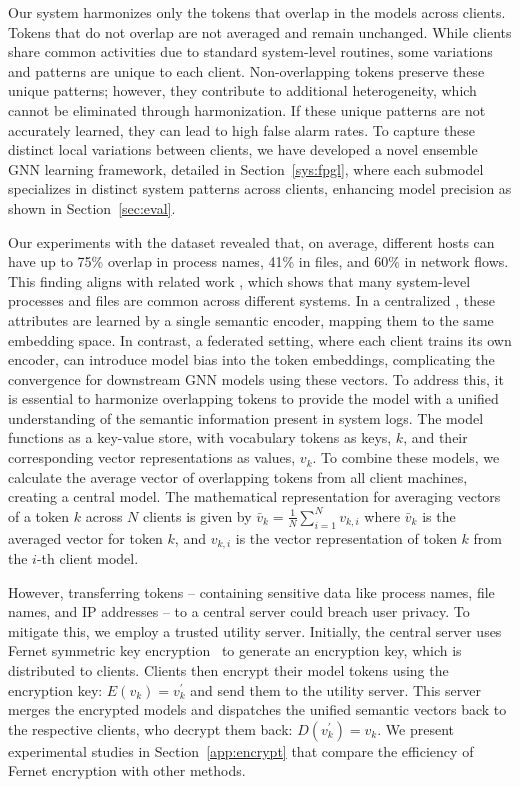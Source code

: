  Our system harmonizes only the tokens that overlap in the \wordvec models across clients. Tokens that do not overlap are not averaged and remain unchanged. While clients share common activities due to standard system-level routines, some variations and patterns are unique to each client. Non-overlapping tokens preserve these unique patterns; however, they contribute to additional heterogeneity, which cannot be eliminated through harmonization. If these unique patterns are not accurately learned, they can lead to high false alarm rates. To capture these distinct local variations between clients, we have developed a novel ensemble GNN learning framework, detailed in Section~\ref{sys:fpgl}, where each submodel specializes in distinct system patterns across clients, enhancing model precision as shown in Section~\ref{sec:eval}.

Our experiments with the \optc dataset revealed that, on average, different hosts can have up to 75\% overlap in process names, 41\% in files, and 60\% in network flows. This finding aligns with related work \cite{flash2024}, which shows that many system-level processes and files are common across different systems. In a centralized \pids, these attributes are learned by a single semantic encoder, mapping them to the same embedding space. In contrast, a federated setting, where each client trains its own encoder, can introduce model bias into the token embeddings, complicating the convergence for downstream GNN models using these vectors. To address this, it is essential to harmonize overlapping tokens to provide the model with a unified understanding of the semantic information present in system logs. 
The \wordvec model functions as a key-value store, with vocabulary tokens as keys, \(k\), and their corresponding vector representations as values, \(v_k\). To combine these models, we calculate the average vector of overlapping tokens from all client machines, creating a central model. The mathematical representation for averaging vectors of a token \(k\) across \(N\) clients is given by \(\bar{v}_k = \frac{1}{N}\sum_{i=1}^{N} v_{k,i}\) where \(\bar{v}_k\) is the averaged vector for token \(k\), and \(v_{k,i}\) is the vector representation of token \(k\) from the \(i\)-th client model.

However, transferring tokens -- containing sensitive data like process names, file names, and IP addresses -- to a central server could breach user privacy. To mitigate this, we employ a trusted utility server. Initially, the central server uses Fernet symmetric key encryption~\cite{ismail2020fernet,bokhari2016review} to generate an encryption key, which is distributed to clients. Clients then encrypt their \wordvec model tokens using the encryption key: \( E(v_{k}) = v_{k}^{'} \) and send them to the utility server. This server merges the encrypted models and dispatches the unified semantic vectors back to the respective clients, who decrypt them back: \( D(v_{k}^{'}) = v_{k} \). We present experimental studies in Section~\ref{app:encrypt} that compare the efficiency of Fernet encryption with other methods.

